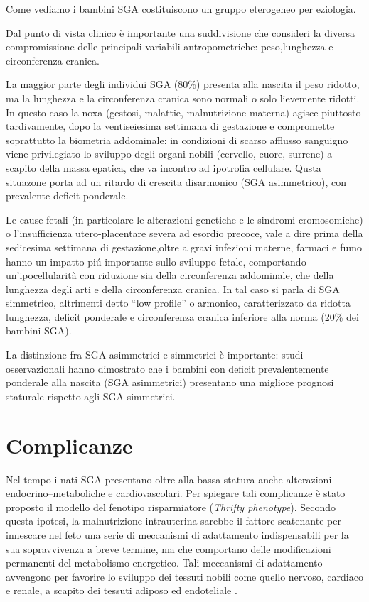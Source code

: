 Come vediamo i bambini SGA costituiscono un gruppo eterogeneo per eziologia.

Dal punto di vista clinico è importante una suddivisione che consideri la diversa compromissione delle principali variabili antropometriche: peso,lunghezza e circonferenza cranica.

La maggior parte degli individui SGA (80\%) presenta alla nascita il peso ridotto, ma la lunghezza e la circonferenza cranica sono normali o solo lievemente ridotti.
In questo caso la noxa (gestosi, malattie, malnutrizione materna) agisce piuttosto tardivamente, dopo la ventiseiesima settimana di gestazione e compromette soprattutto la biometria addominale: in condizioni di scarso afflusso sanguigno viene privilegiato lo sviluppo degli organi nobili (cervello, cuore, surrene) a scapito della massa epatica, che va incontro ad ipotrofia cellulare. 
Qusta situazone porta ad un ritardo di crescita disarmonico (SGA asimmetrico), con prevalente deficit ponderale.

Le cause fetali (in particolare le alterazioni genetiche e le sindromi cromosomiche) o l'insufficienza utero-placentare severa ad esordio 
precoce, vale a dire prima della sedicesima settimana di gestazione,oltre a gravi infezioni materne, farmaci e fumo  hanno un impatto pi\'u importante sullo sviluppo fetale, comportando un'ipocellularità con riduzione sia della circonferenza addominale, che della lunghezza degli arti e della circonferenza cranica. In tal caso si parla di SGA simmetrico, altrimenti detto "`low profile"' o armonico, caratterizzato da ridotta lunghezza, deficit ponderale e circonferenza cranica inferiore alla norma (20\% dei bambini SGA).

La distinzione fra SGA asimmetrici e simmetrici \`e importante: studi osservazionali 
hanno dimostrato che i bambini con deficit prevalentemente ponderale alla nascita 
(SGA asimmetrici) presentano una migliore prognosi staturale rispetto agli SGA simmetrici.\cite{sga-10}

\clearpage

\section{Complicanze}

Nel tempo i nati SGA presentano oltre alla bassa statura anche alterazioni endocrino--metaboliche e cardiovascolari. 
Per spiegare tali complicanze è stato proposto il modello del fenotipo risparmiatore (\textit{Thrifty phenotype}).
Secondo questa ipotesi, la malnutrizione intrauterina sarebbe il fattore scatenante
per innescare nel feto una serie di meccanismi di adattamento indispensabili per 
la sua sopravvivenza a breve termine, ma che comportano delle modificazioni permanenti
del metabolismo energetico.
Tali meccanismi di adattamento avvengono per favorire lo sviluppo dei tessuti 
nobili come quello nervoso, cardiaco e renale, a scapito dei tessuti adiposo ed endoteliale .

